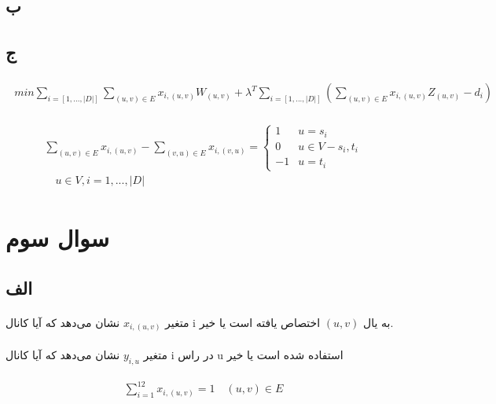 \documentclass[paper=a4, fontsize=11pt]{article}
\numberwithin{equation}{section} %
\numberwithin{figure}{section} %
\numberwithin{table}{section} %
\begin{document}
\subsection{ب}

\subsection{ج}
\begin{align}
\begin{split}
	min \sum_{i = [1, ..., |D|]}\sum_{(u,v) \in E} x_{i,(u,v)}W_{(u,v)} + \lambda^T \sum_{i = [1, ..., |D|]}(\sum_{(u,v) \in E} x_{i,(u,v)}Z_{(u,v)} - d_i)
\end{split}
\end{align}

\begin{align}
\begin{split}
	\sum_{(u,v) \in E} x_{i,(u,v)} - \sum_{(v,u) \in E} x_{i,(v,u)} = 
	\left \{
		\begin{array}{cc}
			1 & u = s_i\\
			0 & u \in V - {s_i, t_i}\\
			-1 & u = t_i
		\end{array}
	\right.
	\\
	\quad u \in V, i = {1, ..., |D|}
\end{split}
\end{align}

\section{سوال سوم}
\subsection{الف}
\paragraph{}
متغیر $x_{i,(u,v)}$ نشان می‌دهد که آیا کانال i به یال $(u,v)$
اختصاص یافته است یا خیر.

\paragraph{}
متغیر $y_{i,u}$ نشان می‌دهد
که آیا کانال i در راس u استفاده شده است یا خیر

\begin{align}
\begin{split}
	\sum_{i=1}^{12} x_{i,(u,v)} = 1
	\quad (u,v) \in E
\end{split}
\end{align}
\end{document}
